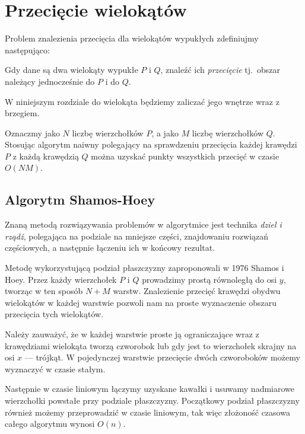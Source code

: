 \chapter{Przecięcie wielokątów}
Problem znalezienia przecięcia dla wielokątów wypukłych zdefiniujmy
następująco:

\begin{problem}
  Gdy dane są dwa wielokąty wypukłe $P$ i $Q$, znaleźć ich
  \emph{przecięcie} tj.\ obszar należący jednocześnie do $P$ i do $Q$.
\end{problem}

W niniejszym rozdziale do wielokąta będziemy zaliczać jego wnętrze
wraz z brzegiem.

Oznaczmy jako $N$ liczbę wierzchołków $P$, a jako $M$ liczbę
wierzchołków $Q$. Stosując algorytm naiwny polegający na sprawdzeniu
przecięcia każdej krawędzi $P$ z każdą krawędzią $Q$ można uzyskać
punkty wszystkich przecięć w czasie $O(NM)$.

\section{Algorytm Shamos-Hoey}
Znaną metodą rozwiązywania problemów w algorytmice jest technika
\emph{dziel i rządź}, polegająca na podziale na mniejsze części,
znajdowaniu rozwiązań częściowych, a następnie łączeniu ich w końcowy
rezultat.

Metodę wykorzystującą podział płaszczyzny zaproponowali w 1976 Shamos
i Hoey. Przez każdy wierzchołek $P$ i $Q$ prowadzimy prostą równoległą
do osi $y$, tworząc w ten sposób $N+M$ warstw. Znalezienie przecięć
krawędzi obydwu wielokątów w każdej warstwie pozwoli nam na proste
wyznaczenie obszaru przecięcia tych wielokątów.

Należy zauważyć, że w każdej warstwie proste ją ograniczające wraz z
krawędziami wielokąta tworzą czworobok lub gdy jest to wierzchołek
skrajny na osi $x$ --- trójkąt. W pojedynczej warstwie przecięcie
dwóch czworoboków możemy wyznaczyć w czasie stałym. %


Następnie w czasie liniowym łączymy uzyskane kawałki i usuwamy
nadmiarowe wierzchołki powstałe przy podziale płaszczyzny. Początkowy
podział płaszczyzny również możemy przeprowadzić w czasie liniowym,
tak więc złożoność czasowa całego algorytmu wynosi $O(n)$.

